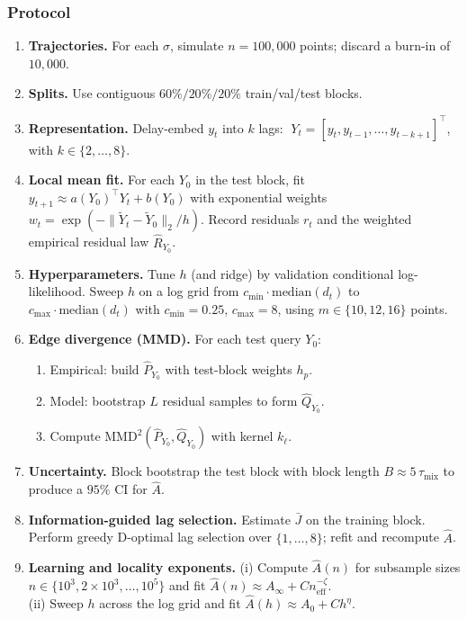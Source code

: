 \documentclass[11pt]{article}
\newcommand{\1}{\mathbf{1}}
\begin{document}
\subsubsection{Protocol}
\begin{enumerate}
  \item \textbf{Trajectories.} For each $\sigma$, simulate $n=100{,}000$ points; discard a burn-in of $10{,}000$.
  \item \textbf{Splits.} Use contiguous $60\%/20\%/20\%$ train/val/test blocks.
  \item \textbf{Representation.} Delay-embed $y_t$ into $k$ lags: 
  $\;Y_t = [y_t, y_{t-1},\dots,y_{t-k+1}]^\top$, 
  with $k \in \{2,\dots,8\}$.
  \item \textbf{Local mean fit.}  
  For each $Y_0$ in the test block, fit $y_{t+1} \approx a(Y_0)^\top Y_t + b(Y_0)$ with exponential weights 
  \(
    w_t = \exp(-\|\widetilde Y_t-\widetilde Y_0\|_2/h).
  \)
  Record residuals $r_t$ and the weighted empirical residual law $\widehat R_{Y_0}$.
  \item \textbf{Hyperparameters.} Tune $h$ (and ridge) by validation conditional log-likelihood. Sweep $h$ on a log grid from $c_{\min}\cdot\mathrm{median}(d_t)$ to $c_{\max}\cdot\mathrm{median}(d_t)$ with $c_{\min}=0.25$, $c_{\max}=8$, using $m\in\{10,12,16\}$ points.
  \item \textbf{Edge divergence (MMD).}  
  For each test query $Y_0$:
  \begin{enumerate}
    \item Empirical: build $\widehat P_{Y_0}$ with test-block weights $h_p$.
    \item Model: bootstrap $L$ residual samples to form $\widehat Q_{Y_0}$.
    \item Compute $\mathrm{MMD}^2(\widehat P_{Y_0},\widehat Q_{Y_0})$ with kernel $k_\ell$.
  \end{enumerate}
  \item \textbf{Uncertainty.} Block bootstrap the test block with block length $B \approx 5\,\tau_{\mathrm{mix}}$ to produce a $95\%$ CI for $\widehat{A}$.
  \item \textbf{Information-guided lag selection.}  
  Estimate $\bar J$ on the training block. Perform greedy D-optimal lag selection over $\{1,\dots,8\}$; refit and recompute $\widehat{A}$.
  \item \textbf{Learning and locality exponents.}  
  (i) Compute $\widehat{A}(n)$ for subsample sizes $n\in\{10^3,2\!\times\!10^3,\dots,10^5\}$ and fit $\widehat{A}(n)\approx A_\infty + Cn_{\mathrm{eff}}^{-\zeta}$. \\
  (ii) Sweep $h$ across the log grid and fit $\widehat{A}(h)\approx A_0 + C h^\eta$.
\end{enumerate}
\end{document}
